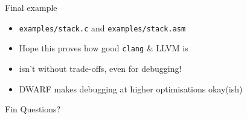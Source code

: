 \documentclass[table,xetex,12pt,aspectratio=169]{beamer}
\begin{document}
\begin{frame}{Final example}
\begin{itemize}
\item \texttt{examples/stack.c} and \texttt{examples/stack.asm}\pause
\item Hope this proves how good \texttt{clang} \& LLVM is
\item {} isn't without trade-offs, even for debugging!
\item DWARF makes debugging at higher optimisations okay(ish)
\end{itemize}
\end{frame}

\begin{frame}{Fin}
\Huge Questions?
\end{frame}
\end{document}
